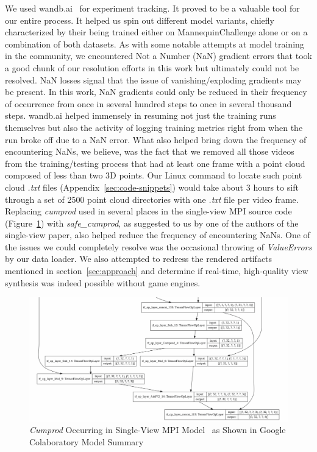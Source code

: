 We used wandb.ai~\cite{wandb} for experiment tracking. It proved to be a valuable tool for our entire process. It helped us spin out different model variants, chiefly characterized by their being trained either on MannequinChallenge alone or on a combination of both datasets. As with some notable attempts at model training in the community, we encountered Not a Number (NaN) gradient errors that took a good chunk of our resolution efforts in this work but ultimately could not be resolved. NaN losses signal that the issue of vanishing/exploding gradients may be present. In this work, NaN gradients could only be reduced in their frequency of occurrence from once in several hundred steps to once in several thousand steps. wandb.ai helped immensely in resuming not just the training runs themselves but also the activity of logging training metrics right from when the run broke off due to a NaN error. What also helped bring down the frequency of encountering NaNs, we believe, was the fact that we removed all those videos from the training/testing process that had at least one frame with a point cloud composed of less than two 3D points. Our Linux command to locate such point cloud \textit{.txt} files (Appendix~\ref{sec:code-snippets}) would take about 3 hours to sift through a set of 2500 point cloud directories with one \textit{.txt} file per video frame. Replacing \textit{cumprod} used in several places in the single-view MPI source code (Figure~\ref{fig:cumprod-model-summary}) with \textit{safe\_cumprod}, as suggested to us by one of the authors of the single-view paper, also helped reduce the frequency of encountering NaNs. One of the issues we could completely resolve was the occasional throwing of \textit{ValueErrors} by our data loader. We also attempted to redress the rendered artifacts mentioned in section~\ref{sec:approach} and determine if real-time, high-quality view synthesis was indeed possible without game engines.

\begin{figure}[!h]
    \includegraphics[width=1\columnwidth]{figures/cumprod.png}
    \caption{\textit{Cumprod} Occurring in Single-View MPI Model~\cite{single_view_mpi} as Shown in Google Colaboratory Model Summary}
    \label{fig:cumprod-model-summary}
\end{figure}

